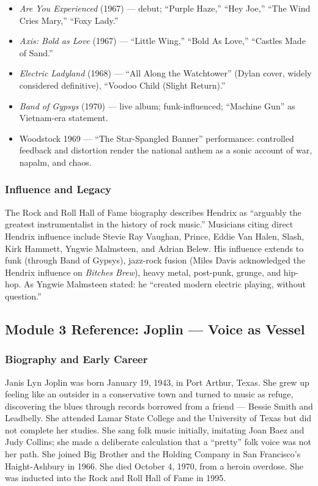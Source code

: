 \documentclass[11pt,letterpaper]{article}
\begin{document}
\begin{itemize}[leftmargin=*]
  \item \textit{Are You Experienced} (1967) --- debut; ``Purple Haze,'' ``Hey Joe,'' ``The Wind Cries Mary,'' ``Foxy Lady.''
  \item \textit{Axis: Bold as Love} (1967) --- ``Little Wing,'' ``Bold As Love,'' ``Castles Made of Sand.''
  \item \textit{Electric Ladyland} (1968) --- ``All Along the Watchtower'' (Dylan cover, widely considered definitive), ``Voodoo Child (Slight Return).''
  \item \textit{Band of Gypsys} (1970) --- live album; funk-influenced; ``Machine Gun'' as Vietnam-era statement.
  \item Woodstock 1969 --- ``The Star-Spangled Banner'' performance: controlled feedback and distortion render the national anthem as a sonic account of war, napalm, and chaos.
\end{itemize}

\subsubsection{Influence and Legacy}

The Rock and Roll Hall of Fame biography describes Hendrix as ``arguably the greatest instrumentalist in the history of rock music.'' Musicians citing direct Hendrix influence include Stevie Ray Vaughan, Prince, Eddie Van Halen, Slash, Kirk Hammett, Yngwie Malmsteen, and Adrian Belew. His influence extends to funk (through Band of Gypsys), jazz-rock fusion (Miles Davis acknowledged the Hendrix influence on \textit{Bitches Brew}), heavy metal, post-punk, grunge, and hip-hop. As Yngwie Malmsteen stated: he ``created modern electric playing, without question.''

\subsection{Module 3 Reference: Joplin --- Voice as Vessel}

\subsubsection{Biography and Early Career}

Janis Lyn Joplin was born January 19, 1943, in Port Arthur, Texas. She grew up feeling like an outsider in a conservative town and turned to music as refuge, discovering the blues through records borrowed from a friend --- Bessie Smith and Leadbelly. She attended Lamar State College and the University of Texas but did not complete her studies. She sang folk music initially, imitating Joan Baez and Judy Collins; she made a deliberate calculation that a ``pretty'' folk voice was not her path. She joined Big Brother and the Holding Company in San Francisco's Haight-Ashbury in 1966. She died October 4, 1970, from a heroin overdose. She was inducted into the Rock and Roll Hall of Fame in 1995.
\end{document}
